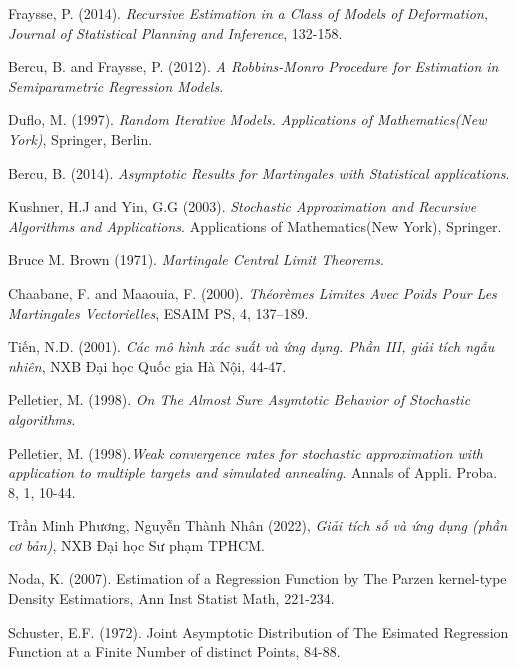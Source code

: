 \begin{thebibliography}{9}

 Fraysse, P. (2014). {\em Recursive Estimation in a Class of Models of Deformation, Journal of Statistical Planning and Inference}, 132-158.
	
 Bercu, B. and Fraysse, P. (2012). {\em A Robbins-Monro Procedure for Estimation in Semiparametric Regression Models}.

 Duflo, M. (1997). {\em Random Iterative Models. Applications of Mathematics(New York)}, Springer, Berlin.

 Bercu, B. (2014). {\em Asymptotic Results for Martingales with Statistical applications}.

 Kushner, H.J and Yin, G.G (2003). {\em Stochastic Approximation and Recursive Algorithms and Applications}. Applications of Mathematics(New York), Springer.

 Bruce M. Brown (1971). {\em Martingale Central Limit Theorems}.

 Chaabane, F. and Maaouia, F. (2000). {\em Théorèmes Limites Avec Poids Pour Les Martingales Vectorielles}, ESAIM PS, 4, 137–189.

 Tiến, N.D. (2001). {\em Các mô hình xác suất và ứng dụng. Phần III, giải tích ngẫu nhiên}, NXB Đại học Quốc gia Hà Nội, 44-47.

 Pelletier, M. (1998). {\em On The Almost Sure Asymtotic Behavior of Stochastic algorithms}.

 Pelletier, M. (1998).{\em Weak convergence rates for stochastic approximation with application to multiple targets and simulated annealing}. Annals of Appli. Proba. 8, 1, 10-44.

 Trần Minh Phương, Nguyễn Thành Nhân (2022), {\em Giải tích số và ứng dụng (phần cơ bản)}, NXB Đại học Sư phạm TPHCM.

 Noda, K. (2007). Estimation of a Regression Function by The Parzen kernel-type Density Estimatiors, Ann Inst Statist Math, 221-234.

 Schuster, E.F. (1972). Joint Asymptotic Distribution of The Esimated Regression Function at a Finite Number of distinct Points, 84-88.

\end{thebibliography}
